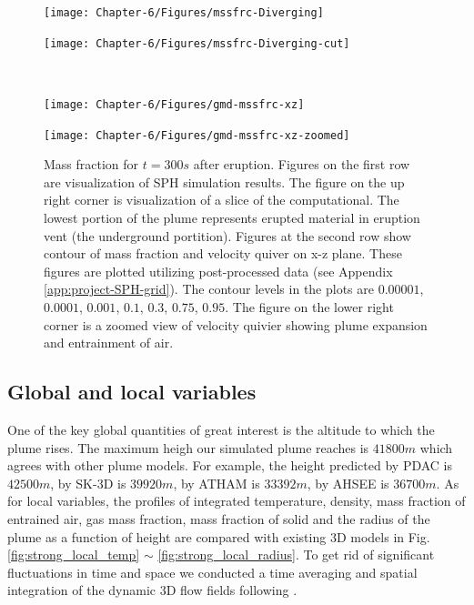 \begin{figure}
    \centering
    \begin{minipage}{.45\textwidth}
        \centering
        \texttt{[image: Chapter-6/Figures/mssfrc-Diverging]}
    \end{minipage}%
    \begin{minipage}{.45 \textwidth}
        \centering
        \texttt{[image: Chapter-6/Figures/mssfrc-Diverging-cut]}
    \end{minipage}%
    \\
    \begin{minipage}{.45 \textwidth}
        \centering
        \texttt{[image: Chapter-6/Figures/gmd-mssfrc-xz]}
    \end{minipage}%
    \begin{minipage}{.45 \textwidth}
        \centering
        \texttt{[image: Chapter-6/Figures/gmd-mssfrc-xz-zoomed]}
    \end{minipage}%
    \caption{Mass fraction for $t=300s$ after eruption. Figures on the first row are visualization of SPH simulation results. The figure on the up right corner is visualization of a slice of the computational. The lowest portion of the plume represents erupted material in eruption vent (the underground portition). Figures at the second row show contour of mass fraction and velocity quiver on x-z plane. These figures are plotted utilizing post-processed data (see Appendix \ref{app:project-SPH-grid}). The contour levels in the plots are $0.00001$, $0.0001$, $0.001$, $0.1$, $0.3$, $0.75$, $0.95$. The figure on the lower right corner is a zoomed view of velocity quivier showing plume expansion and entrainment of air.}
    \label{fig:pinatubo-simulation-results-vis}
\end{figure}

\subsection{Global and local variables}
One of the key global quantities of great interest is the altitude to which the plume rises. The maximum heigh our simulated plume reaches is $41800 m$ which agrees with other plume models. For example, the height predicted by PDAC is $42500 m$, by SK-3D is $39920 m$, by ATHAM is $33392 m$, by AHSEE is $36700 m$. As for local variables, the profiles of integrated temperature, density, mass fraction of entrained air, gas mass fraction, mass fraction of solid and the radius of the plume as a function of height are compared with existing 3D models in Fig. \ref{fig:strong_local_temp} $\sim$ \ref{fig:strong_local_radius}. To get rid of significant fluctuations in time and space we conducted a time averaging and spatial integration of the dynamic 3D flow fields following \citet {cerminara2016large}.

